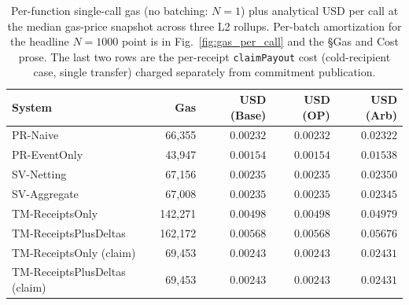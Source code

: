 \begin{table}[t]
\centering
\caption{Per-function single-call gas (no batching: $N{=}1$) plus analytical USD per call at the median gas-price snapshot across three L2 rollups. Per-batch amortization for the headline $N{=}1000$ point is in Fig.~\ref{fig:gas_per_call} and the §Gas and Cost prose. The last two rows are the per-receipt \texttt{claimPayout} cost (cold-recipient case, single transfer) charged separately from commitment publication.}
\label{tab:gas_usd}
\begin{tabular}{lrrrr}
\hline
System & Gas & USD (Base) & USD (OP) & USD (Arb) \\
\hline
PR-Naive & 66,355 & $0.00232$ & $0.00232$ & $0.02322$ \\
PR-EventOnly & 43,947 & $0.00154$ & $0.00154$ & $0.01538$ \\
SV-Netting & 67,156 & $0.00235$ & $0.00235$ & $0.02350$ \\
SV-Aggregate & 67,008 & $0.00235$ & $0.00235$ & $0.02345$ \\
TM-ReceiptsOnly & 142,271 & $0.00498$ & $0.00498$ & $0.04979$ \\
TM-ReceiptsPlusDeltas & 162,172 & $0.00568$ & $0.00568$ & $0.05676$ \\
\hline
TM-ReceiptsOnly (claim) & 69,453 & $0.00243$ & $0.00243$ & $0.02431$ \\
TM-ReceiptsPlusDeltas (claim) & 69,453 & $0.00243$ & $0.00243$ & $0.02431$ \\
\hline
\end{tabular}
\end{table}
